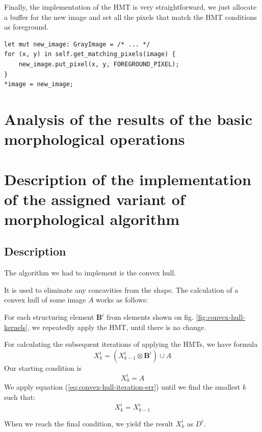 \documentclass[12pt]{article}
\begin{document}
Finally, the implementation of the HMT is very straightforward, we just allocate a buffer for the new image
and set all the pixels that match the HMT conditions as foreground.

\begin{lstlisting}
let mut new_image: GrayImage = /* ... */
for (x, y) in self.get_matching_pixels(image) {
    new_image.put_pixel(x, y, FOREGROUND_PIXEL);
}
*image = new_image;
\end{lstlisting}

\pagebreak[2]
\section{Analysis of the results of the basic morphological operations}

\section{Description of the implementation of the assigned variant of morphological algorithm}

\subsection{Description}
The algorithm we had to implement is the convex hull.

It is used to eliminate any concavities from the shape.
The calculation of a convex hull of some image $A$ works as follows:

For each structuring element $\mathbf{B}^i$ from elements shown on fig. \ref{fig:convex-hull-kernels},
we repeatedly apply the HMT, until there is no change.

For calculating the subsequent iterations of applying the HMTs, we have formula
\begin{equation}
    X^i_k = (X^i_{k-1} \otimes \mathbf{B}^i) \cup A
    \label{eq:convex-hull-iteration-err}
\end{equation}
Our starting condition is
\begin{equation}
    X^i_0 = A
    \label{eq:convex-hull-start-condition}
\end{equation}
We apply equation (\ref*{eq:convex-hull-iteration-err}) until we find the smallest $k$ such that:
\begin{equation}
    X^i_k = X^i_{k-1}
    \label{eq:convex-hull-final-condition}
\end{equation}

When we reach the final condition, we yield the result $X^i_k$ as $D^i$.
\end{document}
